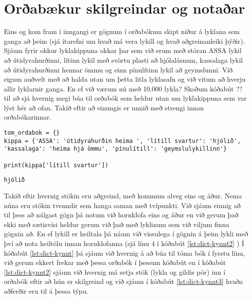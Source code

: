 \section{Orðabækur skilgreindar og notaðar}
Eins og kom fram í inngangi er gögnum í orðabókum skipt niður á lyklana sem ganga að þeim (sjá ítarefni  um hvað má vera lykill og hvað aðgreinanleiki þýðir).
Sjáum fyrir okkur lyklakippuna okkar þar sem við erum með stóran ASSA lykil að útidyrahurðinni, lítinn lykil með svörtu plasti að hjólalásnum, kassalaga lykil að útidyrahurðinni hennar ömmu og einn pínulítinn lykil að geymslunni.
Við eigum auðvelt með að halda utan um þetta litla lyklasafn og við vitum að hverju allir lyklarnir ganga.
En ef við værum nú með 10.000 lykla?
Skoðum kóðabút ?? til að sjá hvernig megi búa til orðabók sem heldur utan um lyklakippuna sem var lýst hér að ofan.
Takið eftir að einungis er unnið með strengi innan orðabókarinnar.

\begin{lstlisting}[caption=Orðabók kynnt með lyklakippusamlíkingu, label=lst:dict-kynnt]
tom_ordabok = {}
kippa = {'ASSA': 'útidyrahurðin heima ', 'lítill svartur': 'hjólið', 'kassalaga': 'heima hjá ömmu', 'pínulítill': 'geymslulykillinn'}

print(kippa['lítill svartur'])
\end{lstlisting}
\lstset{style=uttak}
\begin{lstlisting}
hjólið
\end{lstlisting}
\lstset{style=venjulegt}

Takið eftir hvernig stökin eru aðgreind, með kommum alveg eins og áður.
Nema núna eru stökin tvenndir sem hanga saman með tvípunkti.
Við sjáum einnig að til þess að nálgast gögn þá notum við hornklofa eins og áður en við gerum það ekki með sætisvísi heldur gerum við það með lyklinum sem við viljum finna gögnin að.
En ef lykill er heiltala þá náum við vissulega í gögnin á þeim lykli með því að nota heiltölu innan hornklofanna (sjá línu 4 í kóðabút \ref{lst:dict-kynnt2} )
Í kóðabút \ref{lst:dict-kynnt} þá sjáum við hvernig á að búa til tóma bók í fyrstu línu, við gerum ekkert frekar með þessa orðabók í þessum kóðabút en í kóðabút \ref{lst:dict-kynnt2} sjáum við hvernig má setja stök (lykla og gildis pör) inn í orðabók eftir að hún er skilgreind og við sjáum í kóðabút \ref{lst:dict-kynnt3} hvaða aðferðir eru til á þessa týpu.

